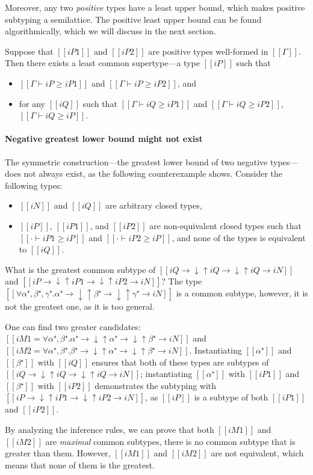 Moreover, any two \emph{positive} types have a least upper bound, which makes
positive subtyping a semilattice. The positive least upper bound can be found
algorithmically, which we will discuss in the next section.

\begin{property}
  Suppose that $[[iP1]]$ and $[[iP2]]$ are positive types
  well-formed in $[[Γ]]$.
  Then there exists a least common supertype---a type $[[iP]]$ such that
  \begin{itemize}
    \item $[[Γ ⊢ iP ≥ iP1]]$ and $[[Γ ⊢ iP ≥ iP2]]$, and 
    \item for any $[[iQ]]$ such that $[[Γ ⊢ iQ ≥ iP1]]$ and $[[Γ ⊢ iQ ≥ iP2]]$,
      $[[Γ ⊢ iQ ≥ iP]]$.
  \end{itemize}
\end{property}

\paragraph*{Negative greatest lower bound might not exist}
The symmetric construction---the greatest lower bound of two negative types---does 
not always exist, as the following counterexample shows.
Consider the following types: 
\begin{itemize}
  \item $[[iN]]$ and $[[iQ]]$ are arbitrary closed types, 
  \item $[[iP]]$, $[[iP1]]$, and $[[iP2]]$ are non-equivalent closed types 
    such that $[[· ⊢ iP1 ≥ iP]]$ and $[[· ⊢ iP2 ≥ iP]]$, and 
    none of the types is equivalent to $[[iQ]]$.
\end{itemize}
What is the greatest common subtype of  
$[[iQ → ↓↑iQ → ↓↑iQ → iN]]$ and $[[iP → ↓↑iP1 → ↓↑iP2 → iN]]$?
The type $[[∀α⁺,β⁺,γ⁺. α⁺ → ↓↑β⁺ → ↓↑γ⁺ → iN]]$ is a common subtype,
however, it is not the greatest one, as it is too general.

One can find two greater candidates:
$[[iM1 = ∀α⁺,β⁺. α⁺ → ↓↑α⁺ → ↓↑β⁺ → iN]]$ and $[[iM2 = ∀α⁺,β⁺. β⁺ → ↓↑α⁺ → ↓↑β⁺ → iN]]$.
Instantiating $[[α⁺]]$ and $[[β⁺]]$ with $[[iQ]]$ ensures 
that both of these types are subtypes of $[[iQ → ↓↑iQ → ↓↑iQ → iN]]$;
instantiating $[[α⁺]]$ with $[[iP1]]$ and $[[β⁺]]$ with $[[iP2]]$
demonstrates the subtyping with $[[iP → ↓↑iP1 → ↓↑iP2 → iN]]$,
as $[[iP]]$ is a subtype of both $[[iP1]]$ and $[[iP2]]$.

By analyzing the inference rules, we can prove that
both $[[iM1]]$ and $[[iM2]]$ are \emph{maximal} common 
subtypes, \ie there is no common subtype that is greater than them.
However, $[[iM1]]$ and $[[iM2]]$ are not equivalent,
which means that none of them is the greatest.

